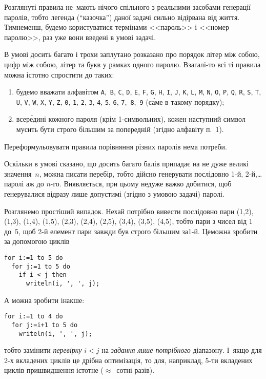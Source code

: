 \Tutorial	Розглянуті правила не~мають нічого спільного з реальними засобами генерації паролів, тобто легенда (``казочка'') даної задачі сильно відірвана від життя. Тим\nolinebreak[2] не\nolinebreak[3] менш, будемо користуватися термінами <<пароль>> і <<номер паролю>>, раз уже вони введені в умові задачі.

В умові досить багато і трохи заплутано розказано про порядок літер між собою, цифр між собою, літер та букв у рамках одного паролю. Взагалі-то всі ті правила можна істотно спростити до таких:
\begin{enumerate}
\item
будемо вважати алфавітом \texttt{A},~\texttt{B}, \texttt{C}, \texttt{D}, \texttt{E}, \texttt{F}, \texttt{G}, \texttt{H}, \texttt{I}, \texttt{J}, \texttt{K}, \texttt{L}, \texttt{M}, \texttt{N}, \texttt{O}, \texttt{P}, \texttt{Q}, \texttt{R}, \texttt{S}, \texttt{T}, \texttt{U}, \texttt{V}, \texttt{W}, \texttt{X}, \texttt{Y}, \texttt{Z}, \texttt{0}, \texttt{1}, \texttt{2}, \texttt{3}, \texttt{4}, \texttt{5}, \texttt{6}, \texttt{7},~\texttt{8},~\texttt{9} (с\'{а}ме в такому порядку);
\item
всер\'{е}дині кожного пароля (крім 1-символьних), кожен наступний символ мусить бути строго більшим за попередній (згідно алфавіту п.~1).
\end{enumerate}
Переформульовувати правила порівняння різних паролів нема потреби.

Оскільки в умові сказано, що досить багато балів припадає на не дуже великі значення~$n$, можна писати перебір, тобто дійсно генерувати послідовно \mbox{1-й}, \mbox{2-й},\nolinebreak[3] \dots{} паролі аж до $n$-го. Виявляється, при цьому не\nolinebreak[3] дуже важко добитися, щоб генерувалися відразу лише допустимі (згідно з умовою задачі) паролі.

Розглянемо простіший випадок. Нехай потрібно вивести послідовно пари (1,2), (1,3), (1,4), (1,5), (2,3), (2,4), (2,5), (3,4), (3,5), (4,5), тобто пари з чисел від 1 до~5, щоб \mbox{2-й} елемент пари завжди був строго більшим за\nolinebreak[2] \mbox{1-й}. Це\nolinebreak[3] можна зробити за допомогою циклів
\begin{verbatim}for i:=1 to 5 do
  for j:=1 to 5 do
    if i < j then
      writeln(i, ', ', j);\end{verbatim}
А можна зробити інакше:
\begin{verbatim}for i:=1 to 4 do
  for j:=i+1 to 5 do
    writeln(i, ', ', j);\end{verbatim}
тобто замінити \emph{перевірку} ${i{<}j}$ на \emph{задання лише потрібного} діапазону. %
І~якщо для \mbox{2-х} вкладених циклів це дрібна оптимізація, то для, наприклад, \mbox{5-ти} вкладених циклів пришвидшення істотне ($\approx$~сотні разів).

